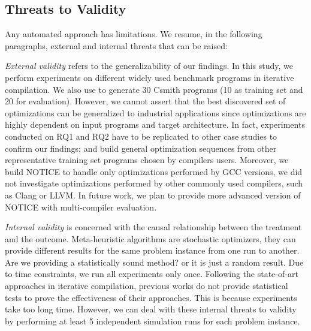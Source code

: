 \subsection{Threats to Validity}
Any automated approach has limitations. We resume, in the following paragraphs, external and internal threats that can be raised:
 
\textit{External validity} refers to the generalizability of our findings. In this study, we perform experiments on different widely used benchmark programs in iterative compilation. We also use to generate 30 Csmith programs (10 as training set and 20 for evaluation). However, we cannot assert that the best discovered set of optimizations can be generalized to industrial applications since optimizations are highly dependent on input programs and target architecture. In fact, experiments conducted on RQ1 and RQ2 have to be replicated to other case studies to confirm our findings; and build general optimization sequences from other representative training set programs chosen by compilers users.
Moreover, we build NOTICE to handle only optimizations performed by GCC versions, we did not investigate optimizations performed by other commonly used compilers, such as Clang or LLVM. In future work, we plan to provide more advanced version of NOTICE with multi-compiler evaluation.

\textit{Internal validity} is concerned with the causal relationship between the treatment and the outcome. Meta-heuristic algorithms are stochastic optimizers, they can provide different results for the same problem instance from one run to another. Are we providing a statistically sound method? or it is just a random result. Due to time constraints, we run all experiments only once. Following the state-of-art approaches in iterative compilation, previous works\cite{hoste2008cole,martinez2014multi} do not provide statistical tests to prove the effectiveness of their approaches. This is because experiments take too long time. However, we can deal with these internal threats to validity by performing at least 5 independent simulation runs for each problem instance.
 
